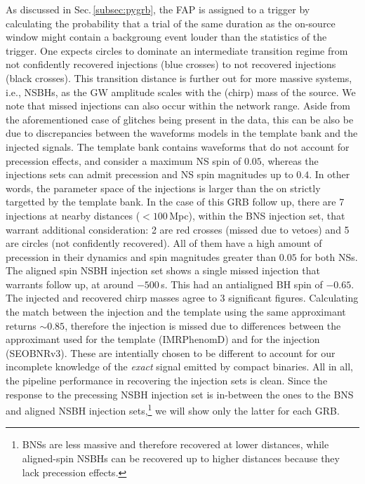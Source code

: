 \documentclass[binding=0.6cm, LaM]{sapthesis}
\begin{document}
	As discussed in Sec.\,\ref{subsec:pygrb}, the FAP is assigned to a trigger 
	by calculating the probability that a trial of the same duration as the on-source window 
	might contain a backgroung event louder than the statistics of the trigger.
        One expects circles to dominate an intermediate transition regime from 
	not confidently recovered injections (blue crosses) to not recovered injections (black crosses).  
	This transition distance is further out for more massive systems, i.e., NSBHs, 
	as the GW amplitude scales with the (chirp) mass of the source. 
	We note that missed injections can also occur within the network range.  
	Aside from the aforementioned case of glitches being present in the data, 
	this can be also be due to discrepancies between 
	the waveforms models in the template bank and the injected signals. 
	The template bank contains waveforms that do not account for precession effects, 
	and consider a maximum NS spin of $0.05$, whereas the injections sets can admit 
	precession and NS spin magnitudes up to $0.4$.
	In other words, the parameter space of the injections is larger 
	than the on strictly targetted by the template bank.
	In the case of this GRB follow up, there are 7 injections at nearby distances ($<100\,$Mpc), 
	within the BNS injection set, that warrant additional consideration: 
        2 are red crosses (missed due to vetoes) and 5 are circles (not confidently recovered).
	All of them have a high amount of precession in their dynamics and spin magnitudes greater than $0.05$ for both NSs.
	The aligned spin NSBH injection set shows a single missed injection that warrants follow up, 
	at around $-500\,$s.
	This had an antialigned BH spin of $-0.65$. 
	The injected and recovered chirp masses agree to 3 significant figures. 
	Calculating the match between the injection and the template using the same approximant returns $\sim 0.85$, 
	therefore the injection is missed due to differences between the approximant 
	used for the template (IMRPhenomD) and for the injection (SEOBNRv3).  
	These are intentially chosen to be different to account for our incomplete knowledge 
	of the \emph{exact} signal emitted by compact binaries.
        All in all, the pipeline performance in recovering the injection sets is clean.  
	Since the response to the precessing NSBH injection set is in-between the ones to the BNS and aligned NSBH injection sets,\footnote{BNSs are less massive and therefore recovered at lower distances, while aligned-spin NSBHs can be recovered up to higher distances because they lack precession effects.}
	we will show only the latter for each GRB.	
\end{document}
